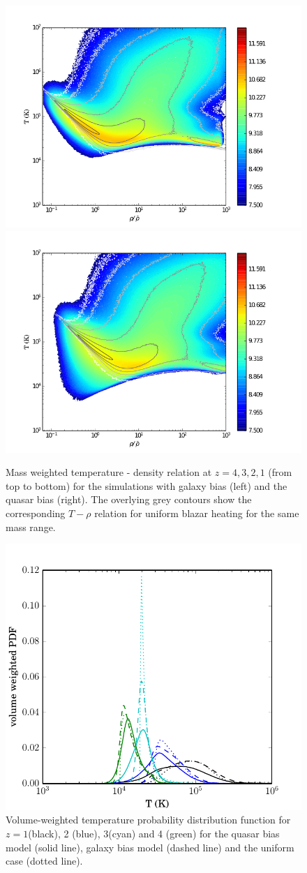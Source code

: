 \documentclass[twocolumns]{emulateapj}
\begin{document}
\begin{figure}
  \includegraphics[width = .42\textwidth ]{T_rho_z1_gal2_ok.png}
  \includegraphics[width = .42\textwidth ]{T_rho_z1_qso4_ok.png}

  \caption{Mass weighted temperature - density relation at $z=4,3,2,1$ (from top to bottom) for the simulations with galaxy bias (left) and the quasar bias (right). The overlying grey contours show the corresponding $T-\rho$ relation for uniform blazar heating \citep{2012MNRAS.423..149P} for the same mass range. }
  \label{fig:T_rho}
\end{figure}


\begin{figure}[h]
  \centering
  \includegraphics[width = .45\textwidth ]{full_PDF_256_gal_qso.pdf}
  \caption{Volume-weighted  temperature probability distribution function for $z=1$(black), 2 (blue), 3(cyan) and 4 (green) for the quasar bias model (solid line), galaxy bias model (dashed line) and the uniform case (dotted line).} 
  \label{fig:PDF}
\end{figure}
\end{document}
